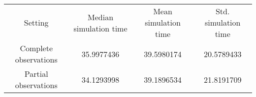 \begin{tabular}{cccc}
Setting & Median simulation time & Mean simulation time & Std. simulation time\\
Complete observations & 35.9977436 & 39.5980174 & 20.5789433\\
Partial observations & 34.1293998 & 39.1896534 & 21.8191709\\
\end{tabular}
